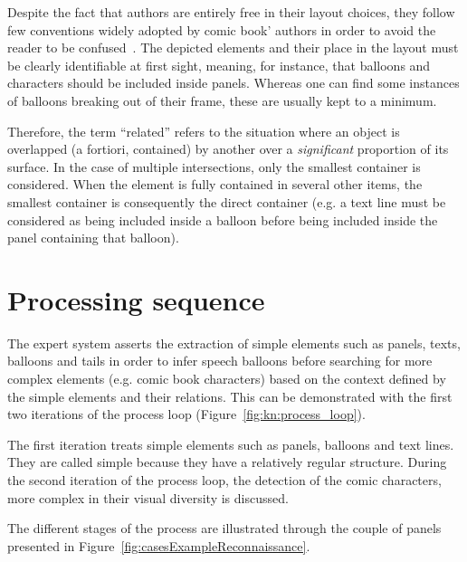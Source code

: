 Despite the fact that authors are entirely free in their layout choices, they follow few conventions widely adopted by comic book' authors in order to avoid the reader to be confused~\cite{Laine2010,Duc1982}.
The depicted elements and their place in the layout must be clearly identifiable at first sight, meaning, for instance, that balloons and characters should be included inside panels.
Whereas one can find some instances of balloons breaking out of their frame, these are usually kept to a minimum.

Therefore, the term ``related'' refers to the situation where an object is overlapped (a fortiori, contained) by another over a \emph{significant} proportion of its surface.
In the case of multiple intersections, only the smallest container is considered.
When the element is fully contained in several other items, the smallest container is consequently the direct container (e.g. a text line must be considered as being included inside a balloon before being included inside the panel containing that balloon).

\section{Processing sequence} %
\label{sec:kn:processing_sequence}

The expert system asserts the extraction of simple elements such as panels, texts, balloons and tails in order to infer speech balloons before searching for more complex elements (e.g. comic book characters) based on the context defined by the simple elements and their relations.
This can be demonstrated with the first two iterations of the process loop (Figure~\ref{fig:kn:process_loop}).

The first iteration treats simple elements such as panels, balloons and text lines.
They are called simple because they have a relatively regular structure.
During the second iteration of the process loop, the detection of the comic characters, more complex in their visual diversity is discussed.

The different stages of the process are illustrated through the couple of panels presented in Figure~\ref{fig:casesExampleReconnaissance}.

